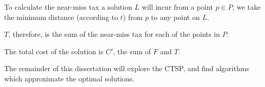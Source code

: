 To calculate the near-miss tax a solution $L$ will incur from a point $p\in P$, we take the minimum distance (according to $t$) from $p$ to any point on $L$.

$T$, therefore, is the sum of the near-miss tax for each of the points in $P$.

The total cost of the solution is $C'$, the sum of $F$ and $T$.

\todo[Illustration]

The remainder of this dissertation will explore the CTSP, and find algorithms which approximate the optimal solutions.
